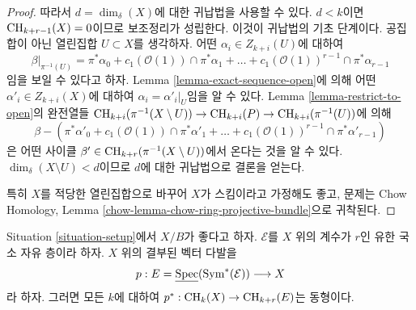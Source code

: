 \begin{proof}
\medskip\noindent
따라서 $d = \dim_\delta(X)$에 대한 귀납법을 사용할 수 있다.
$d < k$이면 $\mathop{\mathrm{CH}}\nolimits_{k + r - 1}(X) = 0$이므로 보조정리가 성립한다.
이것이 귀납법의 기초 단계이다. 공집합이 아닌 열린집합
$U \subset X$를 생각하자. 어떤
$\alpha_i \in Z_{k + i}(U)$에 대하여
$$
\beta|_{\pi^{-1}(U)} =
\pi^*\alpha_0 +
c_1(\mathcal{O}(1)) \cap \pi^*\alpha_1 +
\ldots +
c_1(\mathcal{O}(1))^{r - 1} \cap \pi^*\alpha_{r - 1}
$$
임을 보일 수 있다고 하자. Lemma \ref{lemma-exact-sequence-open}에 의해
어떤 $\alpha'_i \in Z_{k + i}(X)$에 대하여
$\alpha_i = \alpha'_i|_U$임을 알 수 있다.
Lemma \ref{lemma-restrict-to-open}의 완전열들
$\mathop{\mathrm{CH}}\nolimits_{k + i}(\pi^{-1}(X \setminus U)) \to \mathop{\mathrm{CH}}\nolimits_{k + i}(P) \to
\mathop{\mathrm{CH}}\nolimits_{k + i}(\pi^{-1}(U))$에 의해
$$
\beta -
\left(\pi^*\alpha'_0 +
c_1(\mathcal{O}(1)) \cap \pi^*\alpha'_1 +
\ldots +
c_1(\mathcal{O}(1))^{r - 1} \cap \pi^*\alpha'_{r - 1}\right)
$$
은 어떤 사이클 $\beta' \in \mathop{\mathrm{CH}}\nolimits_{k + r}(\pi^{-1}(X \setminus U))$에서
온다는 것을 알 수 있다.
$\dim_\delta(X \setminus U) < d$이므로 $d$에 대한 귀납법으로 결론을 얻는다.

\medskip\noindent
특히 $X$를 적당한 열린집합으로 바꾸어 $X$가 스킴이라고
가정해도 좋고, 문제는 Chow Homology, Lemma
\ref{chow-lemma-chow-ring-projective-bundle}으로 귀착된다.
\end{proof}

\begin{lemma}
\label{lemma-vectorbundle}
Situation \ref{situation-setup}에서 $X/B$가 좋다고 하자.
$\mathcal{E}$를 $X$ 위의 계수가 $r$인 유한 국소 자유 층이라 하자.
$X$ 위의 결부된 벡터 다발을
$$
p :
E = \underline{\mathop{\mathrm{Spec}}}(\text{Sym}^*(\mathcal{E}))
\longrightarrow
X
$$
라 하자. 그러면 모든 $k$에 대하여
$p^* : \mathop{\mathrm{CH}}\nolimits_k(X) \to \mathop{\mathrm{CH}}\nolimits_{k + r}(E)$는 동형이다.
\end{lemma}

